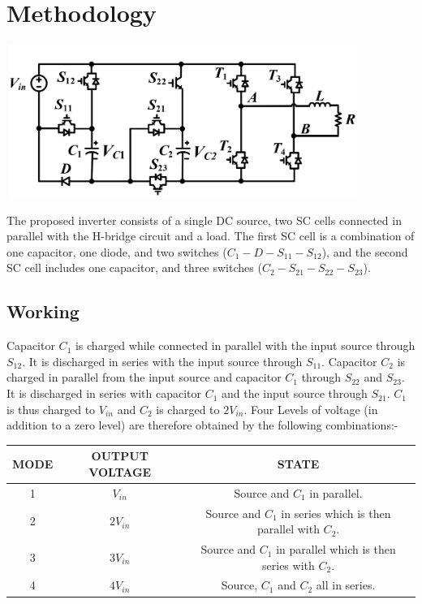 \documentclass[12pt,a4paper]{report}
\begin{document}
\clearpage

\section*{Methodology}

 \begin{center}
 \includegraphics[width=11.5cm,height=5cm]{figures/Main_Circuit}
 \end{center}

 \hspace{0.2cm} The proposed inverter consists of a single DC source, two SC cells connected in parallel with the H-bridge circuit and a load. The first SC cell is a combination of one capacitor, one diode, and two switches ($C_1-D-S_{11}-S_{12}$), and the second SC cell includes one capacitor, and three switches ($C_2-S_{21}-S_{22}-S_{23}$).\\
  
\subsection*{Working}

Capacitor $C_1$ is charged while connected in parallel with the input source through $S_{12}$. It is discharged in series with the input source through $S_{11}$. Capacitor $C_2$ is charged in parallel from the input source and capacitor $C_1$ through $S_{22}$ and $S_{23}$. It is discharged in series with capacitor $C_1$ and the input source through $S_{21}$. $C_1$ is thus charged to $V_{in}$ and $C_2$ is charged to $2V_{in}$. Four Levels of voltage (in addition to a zero level) are therefore obtained by the following combinations:-\\

\begin{center}
	\begin{tabular}{|c|c|c|} 
		\hline
		{\bf MODE} & {\bf OUTPUT VOLTAGE} & {\bf STATE} \\  
		\hline
		1 & $V_{in}$  & Source and $C_1$ in parallel. \\ 
		\hline
		2 & $2V_{in}$ & Source and $C_1$ in series which is then parallel with $C_2$. \\
		\hline
		3 & $3V_{in}$ & Source and $C_1$ in parallel which is then series with $C_2$. \\
		\hline
		4 & $4V_{in}$ & Source, $C_1$ and $C_2$ all in series. \\
		\hline
	\end{tabular}
\end{center}
\end{document}
